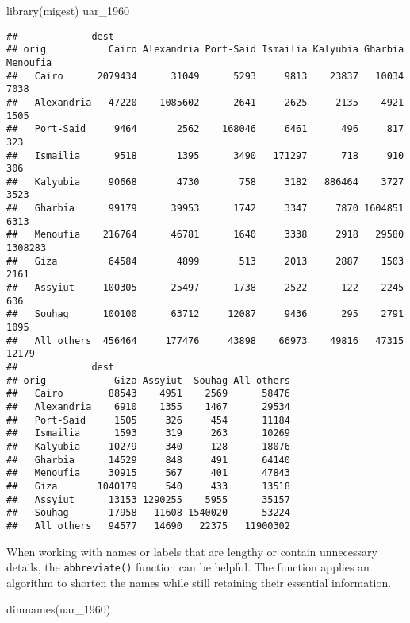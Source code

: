 \documentclass[
]{book}
\newenvironment{Shaded}{\begin{snugshade}}{\end{snugshade}}
\newcommand{\FunctionTok}[1]{\textcolor[rgb]{0.00,0.00,0.00}{#1}}
\newcommand{\NormalTok}[1]{#1}
\begin{document}
\begin{Shaded}
\begin{Highlighting}[]
\FunctionTok{library}\NormalTok{(migest)}
\NormalTok{uar\_1960}
\end{Highlighting}
\end{Shaded}

\begin{verbatim}
##             dest
## orig           Cairo Alexandria Port-Said Ismailia Kalyubia Gharbia Menoufia
##   Cairo      2079434      31049      5293     9813    23837   10034     7038
##   Alexandria   47220    1085602      2641     2625     2135    4921     1505
##   Port-Said     9464       2562    168046     6461      496     817      323
##   Ismailia      9518       1395      3490   171297      718     910      306
##   Kalyubia     90668       4730       758     3182   886464    3727     3523
##   Gharbia      99179      39953      1742     3347     7870 1604851     6313
##   Menoufia    216764      46781      1640     3338     2918   29580  1308283
##   Giza         64584       4899       513     2013     2887    1503     2161
##   Assyiut     100305      25497      1738     2522      122    2245      636
##   Souhag      100100      63712     12087     9436      295    2791     1095
##   All others  456464     177476     43898    66973    49816   47315    12179
##             dest
## orig            Giza Assyiut  Souhag All others
##   Cairo        88543    4951    2569      58476
##   Alexandria    6910    1355    1467      29534
##   Port-Said     1505     326     454      11184
##   Ismailia      1593     319     263      10269
##   Kalyubia     10279     340     128      18076
##   Gharbia      14529     848     491      64140
##   Menoufia     30915     567     401      47843
##   Giza       1040179     540     433      13518
##   Assyiut      13153 1290255    5955      35157
##   Souhag       17958   11608 1540020      53224
##   All others   94577   14690   22375   11900302
\end{verbatim}

When working with names or labels that are lengthy or contain unnecessary details, the \texttt{abbreviate()} function can be helpful. The function applies an algorithm to shorten the names while still retaining their essential information.

\begin{Shaded}
\begin{Highlighting}[]
\FunctionTok{dimnames}\NormalTok{(uar\_1960)}
\end{Highlighting}
\end{Shaded}
\end{document}
